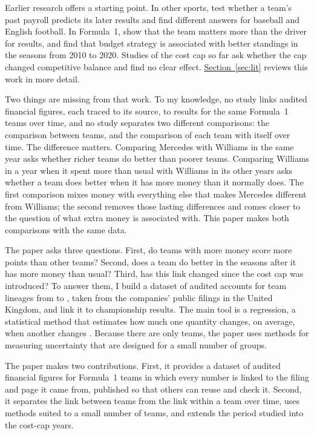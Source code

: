 \documentclass[11pt,a4paper]{article}
\begin{document}
Earlier research offers a starting point. In other sports, \citet{hall2002} test whether
a team's past payroll predicts its later results and find different answers for baseball and English football. In
Formula~1, \citet{bell2016} show that the team matters more than the driver for results, and \citet{lonik2024} find that
budget strategy is associated with better standings in the seasons from 2010 to 2020. Studies of the cost cap so far
\citep{foghsgaard2024, jung2023} ask whether the cap changed competitive balance and find no clear effect.
\hyperref[sec:lit]{Section~\ref*{sec:lit}} reviews this work in more detail.

Two things are missing from that work. To my knowledge, no study links audited financial
figures, each traced to its source, to results for the same Formula~1 teams over time, and no study separates two
different comparisons: the comparison between teams, and the comparison of each team with itself over time. The difference
matters. Comparing Mercedes with Williams in the same year asks whether richer teams do better than poorer teams. Comparing
Williams in a year when it spent more than usual with Williams in its other years asks whether a team does better when it
has more money than it normally does. The first comparison mixes money with everything else that makes Mercedes different
from Williams; the second removes those lasting differences and comes closer to the question of what extra money is
associated with. This paper makes both comparisons with the same data.

The paper asks three questions. First, do teams with more money score more
points than other teams? Second, does a team do better in the seasons after it has more money than usual? Third, has this
link changed since the cost cap was introduced? To answer them, I build a dataset of audited accounts for \NTeams{} team
lineages from \FirstSeason{} to \LastSeason, taken from the companies' public filings in the United Kingdom, and link it to
championship results. The main tool is a regression, a statistical method that estimates how much one quantity changes, on
average, when another changes \citep[Chapter~2]{wooldridge2020}. Because there are only \NTeams{} teams, the paper uses
methods for measuring uncertainty that are designed for a small number of groups.

The paper makes two contributions. First, it provides a dataset of audited financial figures for
Formula~1 teams in which every number is linked to the filing and page it came from, published so that others can reuse
and check it. Second, it separates the link between teams from the link within a team over time, uses methods suited to a
small number of teams, and extends the period studied into the cost-cap years.
\end{document}
